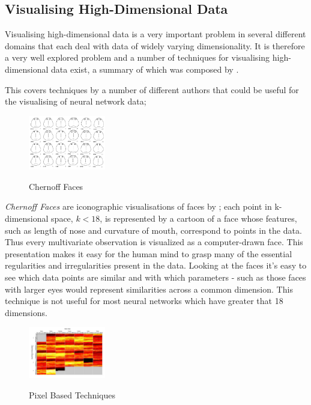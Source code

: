 \documentclass[a4paper,11pt,titlepage]{article}
\begin{document}
\subsection{Visualising High-Dimensional Data}
	Visualising high-dimensional data is a very important problem in several different domains that each deal with data of widely varying dimensionality. It is therefore a very well explored problem and a number of techniques for visualising high-dimensional data exist, a summary of which was composed by \cite{Cristina2003}.
	\par 
	This covers techniques by a number of different authors that could be useful for the visualising of neural network data;	
		\par
		
 	\begin{figure}[H]
    			\centering	
			{{\includegraphics[width=0.3\textwidth]
    				{img/chernoff_faces} 
    			}}%
    			\caption{Chernoff Faces}%
    		\label{fig:lascaux}
	\end{figure}
 		
		 \textit{Chernoff Faces} are iconographic visualisations of faces by \cite{Chernoff1973}; each point in k-dimensional space, $ k < 18 $, is represented by a cartoon of a face whose features, such as length of nose and curvature of mouth, correspond to points in the data. Thus every multivariate observation is visualized as a computer-drawn face. This presentation makes it easy for the human mind to grasp many of the essential regularities and irregularities present in the data. Looking at the faces it's easy to see which data points are similar and with which parameters - such as those faces with larger eyes would represent similarities across a common dimension. This technique is not useful for most neural networks which have greater that 18 dimensions.
		 \par
 		
 	\begin{figure}[H]
    			\centering	
			{{\includegraphics[width=0.3\textwidth]
    				{img/kiem_pixel_two} 
    			}}%
    			\caption{Pixel Based Techniques}%
    		\label{fig:lascaux}
	\end{figure}	
 		
\end{document}
